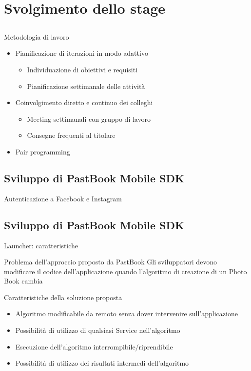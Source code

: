 \section{Svolgimento dello stage}
	\subsection{}
		\begin{frame}{Metodologia di lavoro}
			\begin{itemize}
				\item Pianificazione di iterazioni in modo adattivo
				\begin{itemize}
					\item Individuazione di obiettivi e requisiti
					\item Pianificazione settimanale delle attività
				\end{itemize}
				\item Coinvolgimento diretto e continuo dei colleghi
				\begin{itemize}
					\item Meeting settimanali con gruppo di lavoro
					\item Consegne frequenti al titolare
				\end{itemize}
				\item Pair programming
			\end{itemize}
		\end{frame}
	\subsection{Sviluppo di PastBook Mobile SDK}
		\begin{frame}{Autenticazione a Facebook e Instagram}
			\fontsize{8pt}{7}\selectfont
			
		\end{frame}
	\subsection{Sviluppo di PastBook Mobile SDK}
		\begin{frame}{Launcher: caratteristiche}
			\begin{block}{Problema dell'approccio proposto da PastBook}
				Gli sviluppatori devono modificare il codice dell'applicazione quando l'algoritmo di creazione di un Photo Book
				cambia
			\end{block}
			\begin{block}{Caratteristiche della soluzione proposta}
				\begin{itemize}
					\item Algoritmo modificabile da remoto senza dover intervenire sull'applicazione
					\item Possibilità di utilizzo di qualsiasi Service nell'algoritmo
					\item Esecuzione dell'algoritmo interrompibile/riprendibile
					\item Possibilità di utilizzo dei risultati intermedi dell'algoritmo
				\end{itemize}
			\end{block}
		\end{frame}
